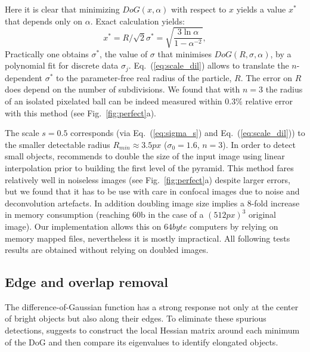 \documentclass[8.5pt,twoside,twocolumn]{article}
\begin{document}
Here it is clear that minimizing $DoG(x, \alpha)$ with respect to $x$ yields a value $x^*$ that depends only on $\alpha$. Exact calculation yields:
\begin{equation}
	x^* = R/\sqrt{2}\sigma^* = \sqrt{\frac{3\ln \alpha}{1-\alpha^{-2}}}, 
	\label{eq:scale_dil}
\end{equation}
Practically one obtains $\sigma^*$, the value of $\sigma$ that minimises $DoG(R,\sigma, \alpha)$, by a polynomial fit for discrete data $\sigma_j$. Eq.~(\ref{eq:scale_dil}) allows to translate the $n$-dependent $\sigma^*$ to the parameter-free real radius of the particle, $R$. The error on $R$ does depend on the number of subdivisions. We found that with $n=3$ the radius of an isolated pixelated ball can be indeed measured within $0.3\%$ relative error with this method (see Fig.~\ref{fig:perfect}a).

The scale $s=0.5$ corresponds (via Eq.~(\ref{eq:sigma_s}) and Eq.~(\ref{eq:scale_dil})) to the smaller detectable radius $R_{min}\approx \unit{3.5}{px}$ ($\sigma_0=1.6$, $n=3$). In order to detect small objects, \citet{Lowe2004} recommends to double the size of the input image using linear interpolation prior to building the first level of the pyramid. This method fares relatively well in noiseless images (see Fig.~\ref{fig:perfect}a) despite larger errors, but we found that it has to be use with care in confocal images due to noise and deconvolution artefacts. In addition doubling image size implies a 8-fold increase in memory consumption (reaching \unit{60}{\giga b} in the case of a $(\unit{512}{px})^3$ original image). Our implementation allows this on $\unit{64}{byte}$ computers by relying on memory mapped files, nevertheless it is mostly impractical. All following tests results are obtained without relying on doubled images.

\subsection*{Edge and overlap removal}

The difference-of-Gaussian function has a strong response not only at the center of bright objects but also along their edges. To eliminate these spurious detections, \citet{Lowe2004} suggests to construct the local Hessian matrix around each minimum of the DoG and then compare its eigenvalues to identify elongated objects.
\end{document}
